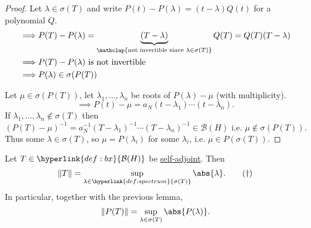 \documentclass{article}
\begin{document}
\begin{proof}
    Let $\lambda \in \sigma(T)$ and write $P(t) - P(\lambda) = (t-\lambda) Q(t)$ for a polynomial $Q$.
    \begin{align*}
        \implies& P(T) - P(\lambda) = \underbrace{(T-\lambda)}_{\mathclap{\text{not invertible since } \lambda \in \sigma(T)}} Q(T) = Q(T) (T - \lambda) \\
        \implies& P(T) - P(\lambda) \text{ is not invertible} \\
        \implies& P(\lambda) \in \sigma(P(T))
    \end{align*}

    Let $\mu \in \sigma(P(T))$, let $\lambda_1, \dotsc, \lambda_n$ be roots of $P(\lambda) - \mu$ (with multiplicity).
    \begin{equation*}
        \implies P(t) - \mu = a_N (t-\lambda_1) \dotsm (t - \lambda_n).
    \end{equation*}
    If $\lambda_1, \dotsc, \lambda_n \notin \sigma(T)$ then
    \begin{equation*}
        (P(T) - \mu)^{-1} = a_N^{-1} (T - \lambda_1)^{-1} \dotsm (T - \lambda_n)^{-1} \in \mathcal{B}(H) \text{ i.e. } \mu \notin \sigma(P(T)).
    \end{equation*}
    Thus some $\lambda \in \sigma(T)$, so $\mu = P(\lambda_i)$ for some $\lambda_i$, i.e. $\mu \in P(\sigma(T))$.
\end{proof}

\begin{lemma}
    Let $T \in \hyperlink{def:bx}{\mathcal{B}(H)}$ be \hyperlink{def:normalMap}{self-adjoint}. Then
    \begin{equation*}
        \|T\| = \sup_{\lambda \in \hyperlink{def:spectrum}{\sigma(T)}} \abs{\lambda}. \label{eq:24dagger} \tag{$\dagger$}
    \end{equation*}
    In particular, together with the previous lemma,
    \begin{equation*}
        \|P(T)\| = \sup_{\lambda \in \sigma(T)} \abs{P(\lambda)}.
    \end{equation*}
\end{lemma}
\end{document}
